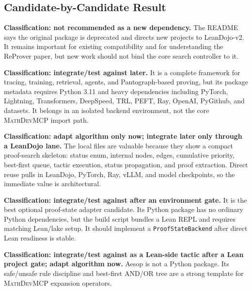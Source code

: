 \documentclass[11pt]{article}
\newcommand{\MathDevMCP}{\textsc{MathDevMCP}}
\begin{document}
\subsection{Candidate-by-Candidate Result}

\begin{description}[style=nextline,leftmargin=0pt]
\item[LeanDojo original.] \textbf{Classification: not recommended as a new
dependency.} The README says the original package is deprecated and directs new
projects to LeanDojo-v2. It remains important for existing compatibility and for
understanding the ReProver paper, but new work should not bind the core search
controller to it.

\item[LeanDojo-v2.] \textbf{Classification: integrate/test against later.}
It is a complete framework for tracing, training, retrieval, agents, and
Pantograph-based proving, but its package metadata requires Python 3.11 and
heavy dependencies including PyTorch, Lightning, Transformers, DeepSpeed, TRL,
PEFT, Ray, OpenAI, PyGithub, and datasets. It belongs in an isolated backend
environment, not the core \MathDevMCP{} import path.

\item[ReProver.] \textbf{Classification: adapt algorithm only now; integrate
later only through a LeanDojo lane.} The local files are valuable because they
show a compact proof-search skeleton: status enum, internal nodes, edges,
cumulative priority, best-first queue, tactic execution, status propagation,
and proof extraction. Direct reuse pulls in LeanDojo, PyTorch, Ray, vLLM, and
model checkpoints, so the immediate value is architectural.

\item[PyPantograph.] \textbf{Classification: integrate/test against after an
environment gate.} It is the best optional proof-state adapter candidate. Its
Python package has no ordinary Python dependencies, but the build script
bundles a Lean REPL and requires matching Lean/lake setup. It should implement
a \texttt{ProofStateBackend} after direct Lean readiness is stable.

\item[Aesop.] \textbf{Classification: integrate/test against as a Lean-side
tactic after a Lean project gate; adapt algorithm now.} Aesop is not a Python
package. Its safe/unsafe rule discipline and best-first AND/OR tree are a
strong template for \MathDevMCP{} expansion operators.


\end{description}
\end{document}
